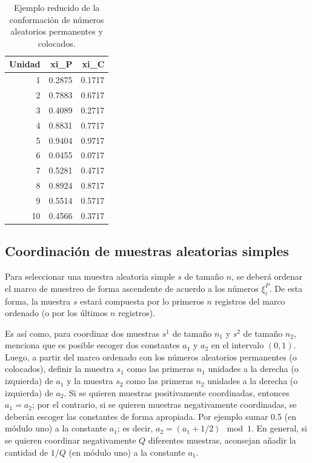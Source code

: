 \documentclass[
  12pt,
]{book}
\begin{document}
\begin{table}

\caption{\label{tab:tabcoor1}Ejemplo reducido de la conformación de números aleatorios permanentes y colocados.}
\centering
\begin{tabular}[t]{r|r|r}
\hline
Unidad & xi\_P & xi\_C\\
\hline
1 & 0.2875 & 0.1717\\
\hline
2 & 0.7883 & 0.6717\\
\hline
3 & 0.4089 & 0.2717\\
\hline
4 & 0.8831 & 0.7717\\
\hline
5 & 0.9404 & 0.9717\\
\hline
6 & 0.0455 & 0.0717\\
\hline
7 & 0.5281 & 0.4717\\
\hline
8 & 0.8924 & 0.8717\\
\hline
9 & 0.5514 & 0.5717\\
\hline
10 & 0.4566 & 0.3717\\
\hline
\end{tabular}
\end{table}

\hypertarget{coordinaciuxf3n-de-muestras-aleatorias-simples}{%
\subsection{Coordinación de muestras aleatorias simples}\label{coordinaciuxf3n-de-muestras-aleatorias-simples}}

Para seleccionar una muestra aleatoria simple \(s\) de tamaño \(n\), se deberá ordenar el marco de muestreo de forma ascendente de acuerdo a los números \(\xi_i^P\). De esta forma, la muestra \(s\) estará compuesta por lo primeros \(n\) registros del marco ordenado (o por los últimos \(n\) registros).

Es así como, para coordinar dos muestras \(s^1\) de tamaño \(n_1\) y \(s^2\) de tamaño \(n_2\), \citet{Ohl95} menciona que es posible escoger dos constantes \(a_1\) y \(a_2\) en el intervalo \((0, 1)\). Luego, a partir del marco ordenado con los números aleatorios permanentes (o colocados), definir la muestra \(s_1\) como las primeras \(n_1\) unidades a la derecha (o izquierda) de \(a_1\) y la muestra \(s_2\) como las primeras \(n_2\) unidades a la derecha (o izquierda) de \(a_2\). Si se quieren muestras positivamente coordinadas, entonces \(a_1 = a_2\); por el contrario, si se quieren muestras negativamente coordinadas, se deberán escoger las constantes de forma apropiada. Por ejemplo sumar 0.5 (en módulo uno) a la constante \(a_1\); es decir, \(a_2 = (a_1 + 1/2) \mod{1}\). En general, si se quieren coordinar negativamente \(Q\) diferentes muestras, \citet{Grafstrom_Matei_2015} aconsejan añadir la cantidad de \(1/Q\) (en módulo uno) a la constante \(a_1\).
\end{document}
